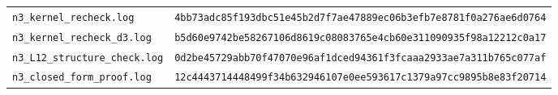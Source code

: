 \documentclass[aps,prx,reprint,superscriptaddress,nobibnotes,longbibliography]{revtex4-2}
\begin{document}
\begin{table}[t]
\begin{ruledtabular}
\begin{tabular}{ll}
\texttt{n3\_kernel\_recheck.log} & \texttt{\scriptsize 4bb73adc85f193dbc51e45b2d7f7ae47889ec06b3efb7e8781f0a276ae6d0764}\\
\texttt{n3\_kernel\_recheck\_d3.log} & \texttt{\scriptsize b5d60e9742be58267106d8619c08083765e4cb60e311090935f98a12212c0a17}\\
\texttt{n3\_L12\_structure\_check.log} & \texttt{\scriptsize 0d2be45729abb70f47070e96af1dced94361f3fcaaa2933ae7a311b765c077af}\\
\texttt{n3\_closed\_form\_proof.log} & \texttt{\scriptsize 12c4443714448499f34b632946107e0ee593617c1379a97cc9895b8e83f20714}\\
\end{tabular}
\end{ruledtabular}
\end{table}
\end{document}
